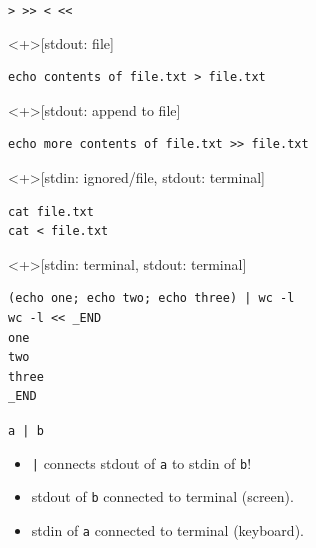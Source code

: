 \begin{frame}[fragile]
  \begin{center}
    \lstinline[basicstyle=\LARGE]{> >> < <<}
  \end{center}
\end{frame}

\begin{frame}[fragile]
  \begin{example}<+>[stdout: file]
    \begin{lstlisting}
echo contents of file.txt > file.txt
    \end{lstlisting}
  \end{example}

  \begin{example}<+>[stdout: append to file]
    \begin{lstlisting}
echo more contents of file.txt >> file.txt
    \end{lstlisting}
  \end{example}
\end{frame}

\begin{frame}[fragile]
  \begin{example}<+>[stdin: ignored/file, stdout: terminal]
    \begin{lstlisting}
cat file.txt
cat < file.txt
    \end{lstlisting}
  \end{example}
\end{frame}

\begin{frame}[fragile]
  \begin{example}<+>[stdin: terminal, stdout: terminal]
    \begin{lstlisting}
(echo one; echo two; echo three) | wc -l
wc -l << _END
one
two
three
_END
    \end{lstlisting}
  \end{example}
\end{frame}

\begin{frame}
  \begin{center}
    \lstinline[basicstyle=\huge]{a | b}
  \end{center}
  \begin{remark}
    \begin{itemize}
      \item \lstinline{|} connects stdout of \lstinline{a} to stdin of 
        \lstinline{b}!
      \item stdout of \lstinline{b} connected to terminal (screen).
      \item stdin of \lstinline{a} connected to terminal (keyboard).
    \end{itemize}
  \end{remark}
\end{frame}


